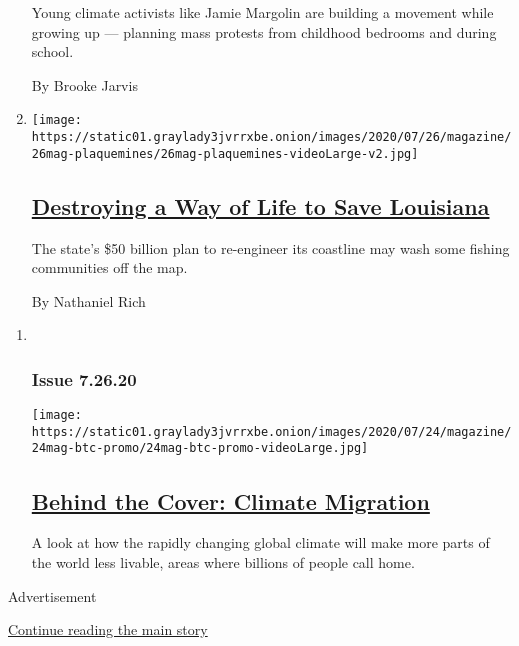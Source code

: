 \begin{enumerate}
  Young climate activists like Jamie Margolin are building a movement
  while growing up --- planning mass protests from childhood bedrooms
  and during school.

  By Brooke Jarvis
\item
  \texttt{[image: https://static01.graylady3jvrrxbe.onion/images/2020/07/26/magazine/26mag-plaquemines/26mag-plaquemines-videoLarge-v2.jpg]}

  \hypertarget{destroying-a-way-of-life-to-save-louisiana}{%
  \subsection{\texorpdfstring{\href{/interactive/2020/07/21/magazine/louisiana-coast-engineering.html}{Destroying
  a Way of Life to Save
  Louisiana}}{Destroying a Way of Life to Save Louisiana}}\label{destroying-a-way-of-life-to-save-louisiana}}

  The state's \$50 billion plan to re-engineer its coastline may wash
  some fishing communities off the map.

  By Nathaniel Rich
\end{enumerate}

\begin{enumerate}
\def\labelenumi{\arabic{enumi}.}
\item ~
  \hypertarget{issue-72620}{%
  \subsubsection{Issue 7.26.20}\label{issue-72620}}

  \texttt{[image: https://static01.graylady3jvrrxbe.onion/images/2020/07/24/magazine/24mag-btc-promo/24mag-btc-promo-videoLarge.jpg]}

  \hypertarget{behind-the-cover-climate-migration}{%
  \subsection{\texorpdfstring{\href{/2020/07/24/magazine/behind-the-cover-climate-migration.html}{Behind
  the Cover: Climate
  Migration}}{Behind the Cover: Climate Migration}}\label{behind-the-cover-climate-migration}}

  A look at how the rapidly changing global climate will make more parts
  of the world less livable, areas where billions of people call home.
\end{enumerate}

Advertisement

\protect\hyperlink{after-mid1}{Continue reading the main story}

